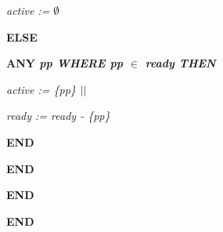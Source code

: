 \documentclass[11pt]{article}
\begin{document}
\begin{sloppypar}
\hspace*{1.20in}\it active \rm :=  $\emptyset$ 

\hspace*{0.80in}\bf ELSE

\hspace*{1.20in}\bf ANY \it pp \bf WHERE \it pp  $\in$  \it ready \bf THEN

\hspace*{1.60in}\it active \rm := \rm \{\it pp\rm \}  $\mbox{$\mid\mid$}$ 

\hspace*{1.60in}\it ready \rm := \it ready \rm - \rm \{\it pp\rm \} 

\hspace*{1.20in}\bf END

\hspace*{0.80in}\bf END

\hspace*{0.40in}\bf END\hspace*{0.35in}

\bf END

\vspace*{4mm}
\newpage
\end{sloppypar}
\end{document}
